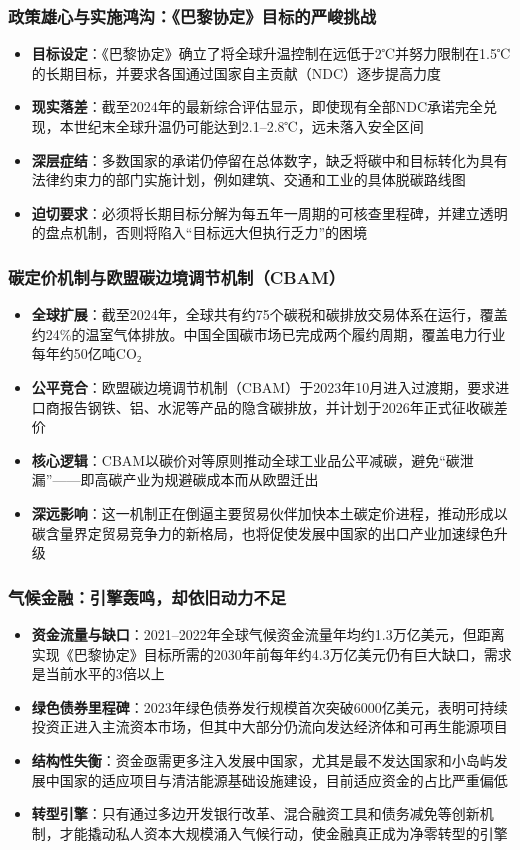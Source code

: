 \documentclass[11pt]{beamer}
\begin{document}
\begin{frame}\frametitle{政策雄心与实施鸿沟：《巴黎协定》目标的严峻挑战}
\begin{itemize}
  \item \textbf{目标设定}：《巴黎协定》确立了将全球升温控制在\alert{远低于2℃}并努力限制在\alert{1.5℃}的长期目标，并要求各国通过国家自主贡献（NDC）逐步提高力度
  \item \textbf{现实落差}：截至2024年的最新综合评估显示，即使现有全部NDC承诺完全兑现，本世纪末全球升温仍可能达到\alert{2.1–2.8℃}，远未落入安全区间
  \item \textbf{深层症结}：多数国家的承诺仍停留在总体数字，缺乏将碳中和目标转化为具有\alert{法律约束力的部门实施计划}，例如建筑、交通和工业的具体脱碳路线图
  \item \textbf{迫切要求}：必须将长期目标分解为每五年一周期的可核查里程碑，并建立透明的盘点机制，否则将陷入“目标远大但执行乏力”的困境
\end{itemize}
\end{frame}

\begin{frame}\frametitle{碳定价机制与欧盟碳边境调节机制（CBAM）}
\begin{itemize}
  \item \textbf{全球扩展}：截至2024年，全球共有约\alert{75个碳税和碳排放交易体系}在运行，覆盖约\alert{24\%}的温室气体排放。中国全国碳市场已完成两个履约周期，覆盖电力行业每年约50亿吨CO₂
  \item \textbf{公平竞合}：欧盟碳边境调节机制（CBAM）于\alert{2023年10月进入过渡期}，要求进口商报告钢铁、铝、水泥等产品的隐含碳排放，并计划于2026年正式征收碳差价
  \item \textbf{核心逻辑}：CBAM以\alert{碳价对等原则}推动全球工业品公平减碳，避免“碳泄漏”——即高碳产业为规避碳成本而从欧盟迁出
  \item \textbf{深远影响}：这一机制正在倒逼主要贸易伙伴加快本土碳定价进程，推动形成以碳含量界定贸易竞争力的新格局，也将促使发展中国家的出口产业加速绿色升级
\end{itemize}
\end{frame}

\begin{frame}\frametitle{气候金融：引擎轰鸣，却依旧动力不足}
\begin{itemize}
  \item \textbf{资金流量与缺口}：2021–2022年全球气候资金流量年均约\alert{1.3万亿美元}，但距离实现《巴黎协定》目标所需的2030年前每年约\alert{4.3万亿美元}仍有巨大缺口，需求是当前水平的3倍以上
  \item \textbf{绿色债券里程碑}：2023年绿色债券发行规模首次突破\alert{6000亿美元}，表明可持续投资正进入主流资本市场，但其中大部分仍流向发达经济体和可再生能源项目
  \item \textbf{结构性失衡}：资金亟需更多注入\alert{发展中国家}，尤其是最不发达国家和小岛屿发展中国家的适应项目与清洁能源基础设施建设，目前适应资金的占比严重偏低
  \item \textbf{转型引擎}：只有通过多边开发银行改革、混合融资工具和债务减免等创新机制，才能撬动私人资本大规模涌入气候行动，使金融真正成为净零转型的引擎
\end{itemize}
\end{frame}
\end{document}
